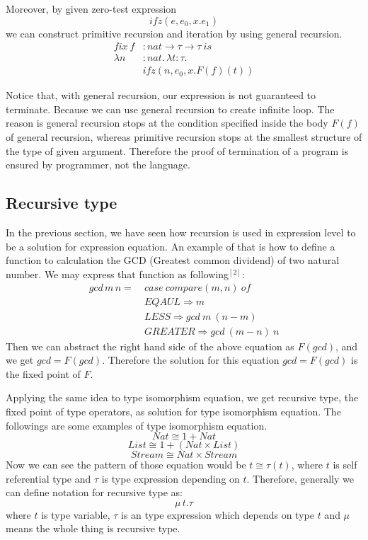 \documentclass{article}
\begin{document}
Moreover, by given zero-test expression
\begin{equation*}
ifz(e,e_{0},x.e_{1})
\end{equation*}
we can construct primitive recursion and iteration by using general recursion.
\begin{align*}
fix \ f&: nat \rightarrow \tau \rightarrow \tau\ is \\
\lambda n&:nat.\,\lambda t:\tau.\\
&ifz(n, e_{0}, x.F(f)(t))
\end{align*}


Notice that, with general recursion, our expression is not guaranteed to terminate. Because we can use general recursion to create infinite loop. The reason is general recursion stops at the condition specified inside the body $F(f)$ of general recursion, whereas primitive recursion stops at the smallest structure of the type of given argument. Therefore the proof of termination of a program is ensured by programmer, not the language.

\subsection*{Recursive type}
In the previous section, we have seen how recursion is used in expression level to be a solution for expression equation. An example of that is how to define a function to calculation the GCD (Greatest common dividend) of two natural number. We may express that function as following$^{[2]}$:
\begin{align*}
gcd\,m\,n =\ & case\ compare(m,n)\ of \\
				& EQAUL \Rightarrow m \\
				& LESS  \Rightarrow gcd\ m\ (n-m)  \\
				& GREATER \Rightarrow  gcd\ (m-n)\ n
\end{align*}
Then we can abstract the right hand side of the above equation as $F(gcd)$, and we get $gcd = F(gcd)$. Therefore the solution for this equation $gcd = F(gcd)$ is the fixed point of $F$.


Applying the same idea to type isomorphism equation, we get recursive type, the fixed point of type operators, as solution for type isomorphism equation. The followings are some examples of type isomorphism equation.
\begin{equation*}
Nat \cong 1+Nat
\end{equation*}
\begin{equation*}
List \cong 1+ (Nat \times List)
\end{equation*}
\begin{equation*}
Stream \cong Nat \times Stream
\end{equation*}
Now we can see the pattern of those equation would be $ t \cong \tau(t)$, where $t$ is self referential type and $\tau$ is type expression depending on $t$. Therefore, generally we can define notation for recursive type as:
\begin{equation*}
\mu\,t.\tau
\end{equation*}
where $t$ is type variable, $\tau$ is an type expression which depends on type $t$ and $\mu$ means the whole thing is recursive type.
\end{document}
